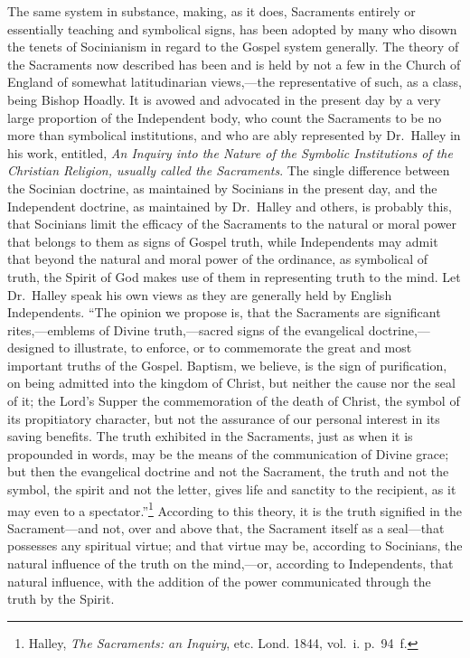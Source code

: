 \documentclass[
]{book}
\begin{document}
The same system in substance, making, as it does, Sacraments entirely or essentially teaching and symbolical signs, has been adopted by many who disown the tenets of Socinianism in regard to the Gospel system generally. The theory of the Sacraments now described has been and is held by not a few in the Church of England of somewhat latitudinarian views,---the representative of such, as a class, being Bishop Hoadly. It is avowed and advocated in the present day by a very large proportion of the Independent body, who count the Sacraments to be no more than symbolical institutions, and who are ably represented by Dr.~Halley in his work, entitled, \emph{An Inquiry into the Nature of the Symbolic Institutions of the Christian Religion, usually called the Sacraments}. The single difference between the Socinian doctrine, as maintained by Socinians in the present day, and the Independent doctrine, as maintained by Dr.~Halley and others, is probably this, that Socinians limit the efficacy of the Sacraments to the natural or moral power that belongs to them as signs of Gospel truth, while Independents may admit that beyond the natural and moral power of the ordinance, as symbolical of truth, the Spirit of God makes use of them in representing truth to the mind. Let Dr.~Halley speak his own views as they are generally held by English Independents. ``The opinion we propose is, that the Sacraments are significant rites,---emblems of Divine truth,---sacred signs of the evangelical doctrine,---designed to illustrate, to enforce, or to commemorate the great and most important truths of the Gospel. Baptism, we believe, is the sign of purification, on being admitted into the kingdom of Christ, but neither the cause nor the seal of it; the Lord's Supper the commemoration of the death of Christ, the symbol of its propitiatory character, but not the assurance of our personal interest in its saving benefits. The truth exhibited in the Sacraments, just as when it is propounded in words, may be the means of the communication of Divine grace; but then the evangelical doctrine and not the Sacrament, the truth and not the symbol, the spirit and not the letter, gives life and sanctity to the recipient, as it may even to a spectator.''\footnote{Halley, \emph{The Sacraments: an Inquiry}, etc. Lond. 1844, vol.~i. p.~94~f.} According to this theory, it is the truth signified in the Sacrament---and not, over and above that, the Sacrament itself as a seal---that possesses any spiritual virtue; and that virtue may be, according to Socinians, the natural influence of the truth on the mind,---or, according to Independents, that natural influence, with the addition of the power communicated through the truth by the Spirit.
\end{document}

